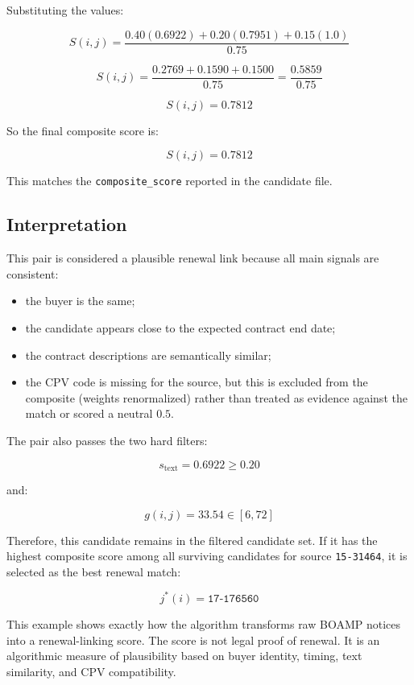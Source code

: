 \documentclass[12pt, a4paper]{article}
\begin{document}
Substituting the values:

\[
S(i,j)
=
\frac{0.40(0.6922)
+
0.20(0.7951)
+
0.15(1.0)}{0.75}
\]

\[
S(i,j)
=
\frac{0.2769
+
0.1590
+
0.1500}{0.75}
=
\frac{0.5859}{0.75}
\]

\[
S(i,j)
=
0.7812
\]

So the final composite score is:

\[
\boxed{S(i,j) = 0.7812}
\]

This matches the \texttt{composite\_score} reported in the candidate file.

\subsection*{Interpretation}

This pair is considered a plausible renewal link because all main signals are
consistent:

\begin{itemize}
  \item the buyer is the same;
  \item the candidate appears close to the expected contract end date;
  \item the contract descriptions are semantically similar;
  \item the CPV code is missing for the source, but this is excluded from the
        composite (weights renormalized) rather than treated as evidence against
        the match or scored a neutral $0.5$.
\end{itemize}

The pair also passes the two hard filters:

\[
s_{\text{text}} = 0.6922 \geq 0.20
\]

and:

\[
g(i,j) = 33.54 \in [6,72]
\]

Therefore, this candidate remains in the filtered candidate set. If it has the
highest composite score among all surviving candidates for source
\texttt{15-31464}, it is selected as the best renewal match:

\[
j^*(i) = \texttt{17-176560}
\]

This example shows exactly how the algorithm transforms raw BOAMP notices into
a renewal-linking score. The score is not legal proof of renewal. It is an
algorithmic measure of plausibility based on buyer identity, timing, text
similarity, and CPV compatibility.

\end{document}
